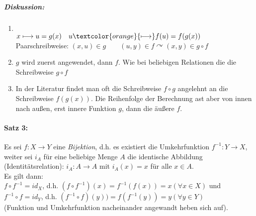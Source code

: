 \subparagraph{Diskussion:}
\begin{enumerate}
\item {} \\
$x \longmapsto u=g(x) \quad u \textcolor{orange}{\longmapsto} f(u) = f(g(x))$\\
Paarschreibweise: $(x,u) \in g \qquad (u,y) \in f \curvearrowright (x,y) \in g \circ f$
\item $g$ wird zuerst angewendet, dann $f$. Wie bei beliebigen Relationen die die Schreibweise $g\circ f$
\item In der Literatur findet man oft die Schreibweise $f\circ g$ angelehnt an die Schreibweise $f(g(x))$. Die Reihenfolge der Berechnung ast aber von innen nach außen, erst innere Funktion $g$, dann die äußere $f$.
\end{enumerate}

\paragraph{Satz 3:} \parskp
Es sei $f: X\rightarrow Y$ eine \emph{Bijektion}, d.h. es existiert die Umkehrfunktion $f^{-1}: Y\rightarrow X$, weiter sei $i_A$ für eine beliebige Menge $A$ die identische Abbildung (Identitätsrelation): $i_A: A\rightarrow A$ mit $i_A(x)=x$ für alle $x\in A$.\\
Es gilt dann: \\
$f \circ f^{-1}= id_X$, d.h. $(f\circ f^{-1})(x)=f^{-1}(f(x))= x (\forall x \in X)$ und \\
$f^{-1}\circ f = id_Y$, d.h. $ (f^{-1}\circ f)(y))= f(f^{-1}(y))=y (\forall y \in Y)$\\
(Funktion und Umkehrfunktion nacheinander angewandt heben sich auf).

